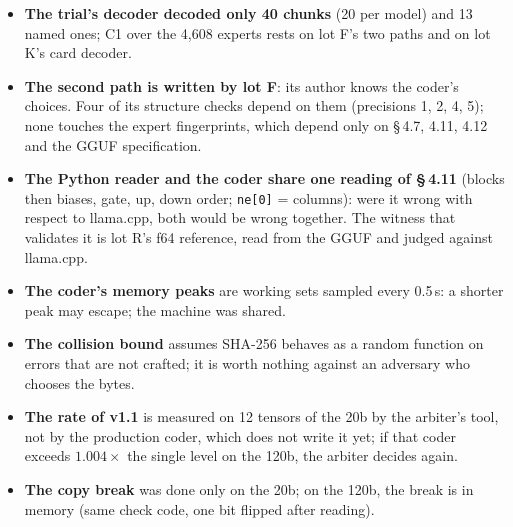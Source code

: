 \begin{faux}
\begin{itemize}
\item \textbf{The trial's decoder decoded only 40 chunks} (20 per model) and 13 named ones; C1 over the 4{,}608 experts rests on lot F's two paths and on lot K's card decoder.
\item \textbf{The second path is written by lot F}: its author knows the coder's choices. Four of its structure checks depend on them (precisions 1, 2, 4, 5); none touches the expert fingerprints, which depend only on §\,4.7, 4.11, 4.12 and the GGUF specification.
\item \textbf{The Python reader and the coder share one reading of §\,4.11} (blocks then biases, gate, up, down order; \texttt{ne[0]} = columns): were it wrong with respect to llama.cpp, both would be wrong together. The witness that validates it is lot R's f64 reference, read from the GGUF and judged against llama.cpp.
\item \textbf{The coder's memory peaks} are working sets sampled every 0.5\,s: a shorter peak may escape; the machine was shared.
\item \textbf{The collision bound} assumes SHA-256 behaves as a random function on errors that are not crafted; it is worth nothing against an adversary who chooses the bytes.
\item \textbf{The rate of v1.1} is measured on 12 tensors of the 20b by the arbiter's tool, not by the production coder, which does not write it yet; if that coder exceeds $1.004 \times$ the single level on the 120b, the arbiter decides again.
\item \textbf{The copy break} was done only on the 20b; on the 120b, the break is in memory (same check code, one bit flipped after reading).
\end{itemize}
\end{faux}
